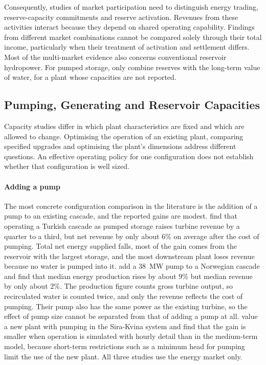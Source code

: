 Consequently, studies of market participation need to distinguish energy
trading, reserve-capacity commitments and reserve activation. Revenues
from these activities interact because they depend on shared operating
capability. Findings from different market combinations cannot be
compared solely through their total income, particularly when their
treatment of activation and settlement differs. Most of the multi-market
evidence also concerns conventional reservoir hydropower. For pumped
storage, only \citet{abgottspon2014} combine reserves with the long-term
value of water, for a plant whose capacities are not reported.

\subsection{Pumping, Generating and Reservoir Capacities}
\label{sec:lit_capacities}

Capacity studies differ in which plant characteristics are fixed and
which are allowed to change. Optimising the operation of an existing
plant, comparing specified upgrades and optimising the plant's
dimensions address different questions. An effective operating policy
for one configuration does not establish whether that configuration is
well sized.

\paragraph{Adding a pump}
The most concrete configuration comparison in the literature is the
addition of a pump to an existing cascade, and the reported gains are
modest. \citet{ak2019quantifying} find that operating a Turkish cascade
as pumped storage raises turbine revenue by a quarter to a third, but
net revenue by only about 6\% on average after the cost of pumping. Total
net energy supplied falls, most of the gain comes from the reservoir with
the largest storage, and the most downstream plant loses revenue because
no water is pumped into it. \citet{alic2023optimal} add a
\SI{38}{\mega\watt} pump to a Norwegian cascade and find that median
energy production rises by about 9\% but median revenue by only about
2\%. The production figure counts gross turbine output, so recirculated
water is counted twice, and only the revenue reflects the cost of
pumping. Their pump also has the same power as the existing turbine, so
the effect of pump size cannot be separated from that of adding a pump
at all. \citet{schuller2024practical} value a new plant with pumping in
the Sira-Kvina system and find that the gain is smaller when operation is
simulated with hourly detail than in the medium-term model, because
short-term restrictions such as a minimum head for pumping limit the use
of the new plant. All three studies use the energy market only.


